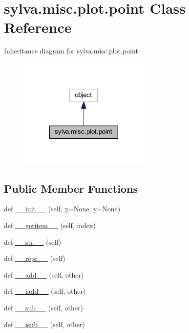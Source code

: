 \hypertarget{classsylva_1_1misc_1_1plot_1_1point}{}\section{sylva.\+misc.\+plot.\+point Class Reference}
\label{classsylva_1_1misc_1_1plot_1_1point}


Inheritance diagram for sylva.\+misc.\+plot.\+point\+:\nopagebreak
\begin{figure}[H]
\begin{center}
\leavevmode
\includegraphics[width=185pt]{classsylva_1_1misc_1_1plot_1_1point__inherit__graph}
\end{center}
\end{figure}
\subsection*{Public Member Functions}
\begin{DoxyCompactItemize}
\item 
def \hyperlink{classsylva_1_1misc_1_1plot_1_1point_a081090273abbdf33a6d4817720887cae}{\+\_\+\+\_\+init\+\_\+\+\_\+} (self, \hyperlink{classsylva_1_1misc_1_1plot_1_1point_a268ceb8acaa96e215d84447421cbadc0}{x}=None, \hyperlink{classsylva_1_1misc_1_1plot_1_1point_ac2bc4268769be52f4443f74b619cd781}{y}=None)
\item 
def \hyperlink{classsylva_1_1misc_1_1plot_1_1point_a38c8a33b3548844e6aa0be06d639dc5f}{\+\_\+\+\_\+getitem\+\_\+\+\_\+} (self, index)
\item 
def \hyperlink{classsylva_1_1misc_1_1plot_1_1point_a0dba47ef31ba24b71bddf5d2c60c104b}{\+\_\+\+\_\+str\+\_\+\+\_\+} (self)
\item 
def \hyperlink{classsylva_1_1misc_1_1plot_1_1point_ae31f3d284d92f335bf4723af06a45bea}{\+\_\+\+\_\+repr\+\_\+\+\_\+} (self)
\item 
def \hyperlink{classsylva_1_1misc_1_1plot_1_1point_abd550240b0bf5fb6fca1d4a2c9bd9db2}{\+\_\+\+\_\+add\+\_\+\+\_\+} (self, other)
\item 
def \hyperlink{classsylva_1_1misc_1_1plot_1_1point_a52992e538e21670f48a5ee5d63aafc5c}{\+\_\+\+\_\+iadd\+\_\+\+\_\+} (self, other)
\item 
def \hyperlink{classsylva_1_1misc_1_1plot_1_1point_a1670d6546eb506a535047d71dc8faaee}{\+\_\+\+\_\+sub\+\_\+\+\_\+} (self, other)
\item 
def \hyperlink{classsylva_1_1misc_1_1plot_1_1point_a0f73456638159eb552d6aef70d76ea57}{\+\_\+\+\_\+isub\+\_\+\+\_\+} (self, other)
\end{DoxyCompactItemize}
